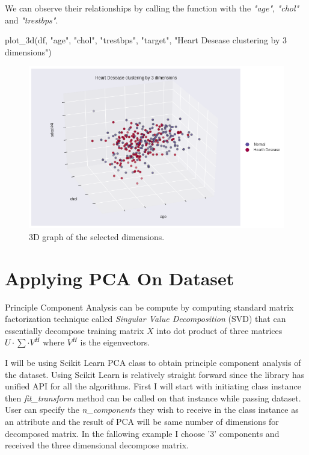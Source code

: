 \documentclass[12pt]{article}
\begin{document}
We can observe their relationships by calling the function with the \textit{"age"}, \textit{"chol"} and \textit{"trestbps"}.

\begin{python}
    plot_3d(df, "age", "chol", "trestbps", "target", "Heart Desease clustering by 3 dimensions")
\end{python}

\begin{figure}[H]
    \centering
    \includegraphics[width=\textwidth]{img/3d-selected.png}
    \caption{3D graph of the selected dimensions.}
\end{figure}

\section*{Applying PCA On Dataset}

Principle Component Analysis can be compute by computing standard matrix factorization technique called \textit{Singular Value Decomposition} (SVD) that can essentially decompose training matrix $X$ into dot product of three matrices $U \cdot \sum \cdot V^{H}$ where $V^{H}$ is the eigenvectors. 

I will be using Scikit Learn PCA class to obtain principle component analysis of the dataset. Using Scikit Learn is relatively straight forward since the library has unified API for all the algorithms. First I will start with initiating class instance then \textit{fit\_transform} method can be called on that instance while passing dataset. User can specify the \textit{n\_components} they wish to receive in the class instance as an attribute and the result of PCA will be same number of dimensions for decomposed matrix. In the fallowing example I choose '3' components and received the three dimensional decompose matrix.  
\end{document}

